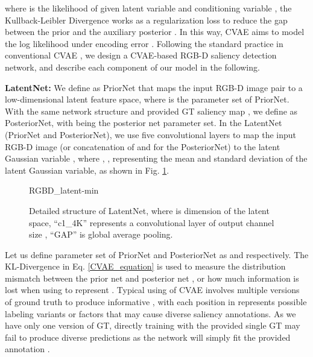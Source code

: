 \documentclass[10pt,twocolumn,letterpaper]{article}
\begin{document}
where  is the likelihood of  given latent variable  and conditioning variable , the Kullback-Leibler Divergence  works as a regularization loss to reduce the gap between the prior  and the auxiliary posterior . 
In this way, CVAE aims to model the log likelihood  under encoding error .
Following the standard practice in conventional CVAE \cite{structure_output}, we design a CVAE-based RGB-D saliency detection network, and describe each component of our model in the following.


\noindent\textbf{LatentNet:} 
We define  as PriorNet that maps the input RGB-D image pair  to a low-dimensional latent feature space, where  is the parameter set of PriorNet. With the same network structure and provided GT saliency map , we define  as PosteriorNet, with  being the posterior net parameter set. 
In the LatentNet (PriorNet and PosteriorNet), we use five convolutional layers to map the input RGB-D image  (or concatenation of  and  for the PosteriorNet) to the latent Gaussian variable
,
where ,  , representing the mean and standard deviation of the latent Gaussian variable, as shown in Fig. \ref{fig:encoder_latent}.







\begin{figure}[t!]
	\centering
    \small
	\begin{overpic}[width=1.0\columnwidth]{RGBD_latent-min}
    \end{overpic}
	\caption{Detailed structure of LatentNet,
where  is dimension of the latent space, \enquote{c1\_4K} represents a  convolutional layer of output channel size , \enquote{GAP} is global average pooling.}
    \vspace{-4mm}
    \label{fig:encoder_latent}
\end{figure}

Let us define parameter set of PriorNet and PosteriorNet as  and  respectively. The KL-Divergence in Eq. \eqref{CVAE_equation} is used to measure the distribution mismatch between the prior net  and posterior net , or how much information is lost when using  to represent .
Typical using of CVAE involves multiple versions of ground truth  \cite{probabilistic_unet} to produce informative , with each position in  represents possible labeling variants or factors that may cause diverse saliency annotations. As we have only one version of GT, directly training with the provided single GT may fail to produce diverse predictions as the network will simply fit the provided annotation .
\end{document}
